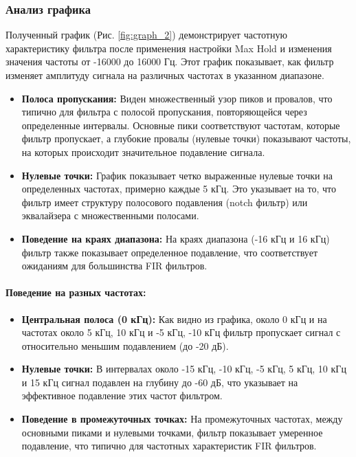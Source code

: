 \documentclass[a4paper,12pt]{extarticle}
\begin{document}
\subsubsection{Анализ графика}

\hspace{1.15cm}Полученный график (Рис. \ref{fig:graph_2}) демонстрирует частотную характеристику 
фильтра после применения настройки Max Hold и изменения значения частоты от -16000 до 16000 Гц. 
Этот график показывает, как фильтр изменяет амплитуду сигнала на различных частотах в указанном 
диапазоне.

\begin{itemize}
    \item \textbf{Полоса пропускания:}
    Виден множественный узор пиков и провалов, что типично для фильтра с полосой пропускания, повторяющейся через определенные интервалы. Основные пики соответствуют частотам, которые фильтр пропускает, а глубокие провалы (нулевые точки) показывают частоты, на которых происходит значительное подавление сигнала.
    
    \item \textbf{Нулевые точки:}
    График показывает четко выраженные нулевые точки на определенных частотах, примерно каждые 5 кГц. Это указывает на то, что фильтр имеет структуру полосового подавления (notch фильтр) или эквалайзера с множественными полосами.
    
    \item \textbf{Поведение на краях диапазона:}
    На краях диапазона (-16 кГц и 16 кГц) фильтр также показывает определенное подавление, что соответствует ожиданиям для большинства FIR фильтров.
\end{itemize}

\paragraph{Поведение на разных частотах:}

\begin{itemize}
    \item \textbf{Центральная полоса (0 кГц):}
    Как видно из графика, около 0 кГц и на частотах около 5 кГц, 10 кГц и -5 кГц, -10 кГц фильтр пропускает сигнал с относительно меньшим подавлением (до -20 дБ).
    
    \item \textbf{Нулевые точки:}
    В интервалах около -15 кГц, -10 кГц, -5 кГц, 5 кГц, 10 кГц и 15 кГц сигнал подавлен на глубину до -60 дБ, что указывает на эффективное подавление этих частот фильтром.
    
    \item \textbf{Поведение в промежуточных точках:}
    На промежуточных частотах, между основными пиками и нулевыми точками, фильтр показывает умеренное подавление, что типично для частотных характеристик FIR фильтров.
\end{itemize}
\end{document}
